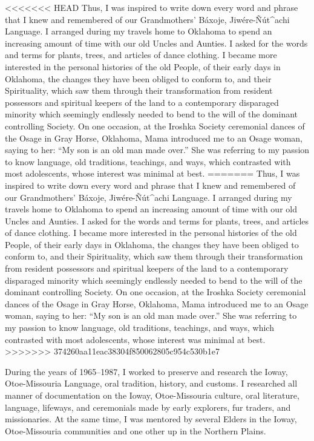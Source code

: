 \documentclass[output=paper]{LSP/langsci}
\begin{document}
<<<<<<< HEAD
Thus, I was inspired to write down every word and phrase that I knew and remembered of our Grandmothers' Báxoje, Jiw\'ere-\~N\'ut\^{ }achi Language. I arranged during my travels home to Oklahoma to spend an increasing amount of time with our old Uncles and Aunties. I asked for the words and terms for plants, trees, and articles of dance clothing. I became more interested in the personal histories of the old People, of their early days in Oklahoma, the changes they have been obliged to conform to, and their Spirituality, which saw them through their transformation from resident possessors and spiritual keepers of the land to a contemporary disparaged minority which seemingly endlessly needed to bend to the will of the dominant controlling Society. On one occasion, at the Iroshka Society ceremonial dances of the O\-sage in Gray Horse, Oklahoma, Mama introduced me to an Osage woman, saying to her: ``My son is an old man made over.'' She was referring to my passion to know language, old traditions, teachings, and ways, which contrasted with most adolescents, whose interest was minimal at best.
=======
Thus, I was inspired to write down every word and phrase that I knew and remembered of our Grandmothers' B\'axoje, Jiw\'ere-\~N\'ut\^{ }achi Language. I arranged during my travels home to Oklahoma to spend an increasing amount of time with our old Uncles and Aunties. I asked for the words and terms for plants, trees, and articles of dance clothing. I became more interested in the personal histories of the old People, of their early days in Oklahoma, the changes they have been obliged to conform to, and their Spirituality, which saw them through their transformation from resident possessors and spiritual keepers of the land to a contemporary disparaged minority which seemingly endlessly needed to bend to the will of the dominant controlling Society. On one occasion, at the Iroshka Society ceremonial dances of the O\-sage in Gray Horse, Oklahoma, Mama introduced me to an Osage woman, saying to her: ``My son is an old man made over.'' She was referring to my passion to know language, old traditions, teachings, and ways, which contrasted with most adolescents, whose interest was minimal at best.
>>>>>>> 374260aa11eac38304f850062805c954c530b1e7

During the years of 1965--1987, I worked to preserve and research the Ioway, Otoe-Missouria Language, oral tradition, history, and customs. I researched all manner of documentation on the Ioway, Otoe-Missouria culture, oral literature, language, lifeways, and ceremonials made by early explorers, fur traders, and missionaries. At the same time, I was mentored by several Elders in the Ioway, Otoe-Missouria communities and one other up in the Northern Plains.
\end{document}
